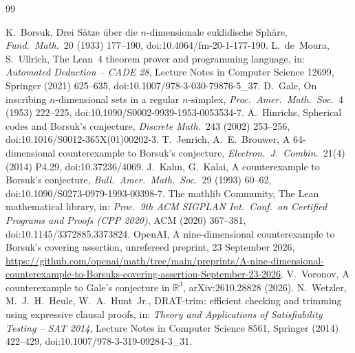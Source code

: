 \documentclass[10pt,a4paper,reqno]{amsart}
\newcommand{\R}{\mathbb R}
\begin{document}
\begin{thebibliography}{99}\small\raggedright
{} K.~Borsuk, Drei S\"atze \"uber die $n$-dimensionale euklidische Sph\"are, \emph{Fund.\ Math.}\ 20 (1933) 177--190, doi:10.4064/fm-20-1-177-190.
 L.~de~Moura, S.~Ullrich, The Lean~4 theorem prover and programming language, in: \emph{Automated Deduction -- CADE 28}, Lecture Notes in Computer Science 12699, Springer (2021) 625--635, doi:10.1007/978-3-030-79876-5\_37.
 D.~Gale, On inscribing $n$-dimensional sets in a regular $n$-simplex, \emph{Proc.\ Amer.\ Math.\ Soc.}\ 4 (1953) 222--225, doi:10.1090/S0002-9939-1953-0053534-7.
 A.~Hinrichs, Spherical codes and Borsuk's conjecture, \emph{Discrete Math.}\ 243 (2002) 253--256, doi:10.1016/S0012-365X(01)00202-3.
 T.~Jenrich, A.~E.~Brouwer, A 64-dimensional counterexample to Borsuk's conjecture, \emph{Electron.\ J.\ Combin.}\ 21(4) (2014) P4.29, doi:10.37236/4069.
 J.~Kahn, G.~Kalai, A counterexample to Borsuk's conjecture, \emph{Bull.\ Amer.\ Math.\ Soc.}\ 29 (1993) 60--62, doi:10.1090/S0273-0979-1993-00398-7.
 The mathlib Community, The Lean mathematical library, in: \emph{Proc.\ 9th ACM SIGPLAN Int.\ Conf.\ on Certified Programs and Proofs (CPP 2020)}, ACM (2020) 367--381, doi:10.1145/3372885.3373824.
 OpenAI, A nine-dimensional counterexample to Borsuk's covering assertion, unrefereed preprint, 23 September 2026, \url{https://github.com/openai/math/tree/main/preprints/A-nine-dimensional-counterexample-to-Borsuks-covering-assertion-September-23-2026}.
 V.~Voronov, A counterexample to Gale's conjecture in $\R^3$, arXiv:2610.28828 (2026).
 N.~Wetzler, M.~J.~H.~Heule, W.~A.~Hunt~Jr., DRAT-trim: efficient checking and trimming using expressive clausal proofs, in: \emph{Theory and Applications of Satisfiability Testing -- SAT 2014}, Lecture Notes in Computer Science 8561, Springer (2014) 422--429, doi:10.1007/978-3-319-09284-3\_31.
\end{thebibliography}
\end{document}
